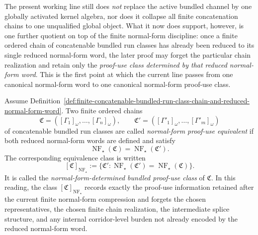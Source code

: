 \begin{remark}
\label{rem:status-of-the-first-normal-form-determined-bundled-proof-use-class-step}
The present working line still does \emph{not} replace the active bundled channel by one globally activated kernel algebra, nor does it collapse all finite concatenation chains to one unqualified global object. What it now does support, however, is one further quotient on top of the finite normal-form discipline: once a finite ordered chain of concatenable bundled run classes has already been reduced to its single reduced normal-form word, the later proof may forget the particular chain realization and retain only the \emph{proof-use class determined by that reduced normal-form word}. This is the first point at which the current line passes from one canonical normal-form word to one canonical normal-form proof-use class.
\end{remark}

\begin{definition}
\label{def:normal-form-determined-bundled-proof-use-class}
Assume Definition~\ref{def:finite-concatenable-bundled-run-class-chain-and-reduced-normal-form-word}. Two finite ordered chains
\[
\mathfrak C=([\Gamma_1]_{\omega},\dots,[\Gamma_n]_{\omega}),
\qquad
\mathfrak C'=([\Gamma'_1]_{\omega},\dots,[\Gamma'_m]_{\omega})
\]
of concatenable bundled run classes are called \emph{normal-form proof-use equivalent} if both reduced normal-form words are defined and satisfy
\[
\operatorname{NF}_{\star}(\mathfrak C)=\operatorname{NF}_{\star}(\mathfrak C').
\]
The corresponding equivalence class is written
\[
[\mathfrak C]_{\operatorname{NF}_{\star}}
:=
\{\mathfrak C' : \operatorname{NF}_{\star}(\mathfrak C')=\operatorname{NF}_{\star}(\mathfrak C)\}.
\]
It is called the \emph{normal-form-determined bundled proof-use class} of \(\mathfrak C\). In this reading, the class \([\mathfrak C]_{\operatorname{NF}_{\star}}\) records exactly the proof-use information retained after the current finite normal-form compression and forgets the chosen representatives, the chosen finite chain realization, the intermediate splice structure, and any internal corridor-level burden not already encoded by the reduced normal-form word.
\end{definition}

